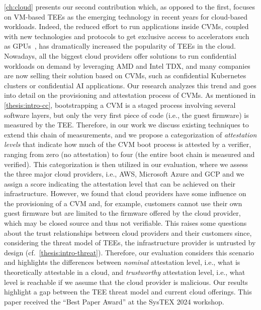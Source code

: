 \cref{ch:cloud} presents our second contribution which, as opposed to the first,
focuses on \acs{VM}-based \acp{TEE} as the emerging technology in recent years
for cloud-based workloads. Indeed, the reduced effort to run applications inside
\acp{CVM}, coupled with new technologies and protocols to get exclusive access
to accelerators such as GPUs~\cite{nvidiaCC}, has dramatically increased the
popularity of \acp{TEE} in the cloud. Nowadays, all the biggest cloud providers
offer solutions to run confidential workloads on demand by leveraging AMD
\sevsnp{} and Intel \ac{TDX}, and many companies are now selling their solution
based on \acp{CVM}, such as confidential Kubernetes clusters or confidential AI
applications. Our research analyzes this trend and goes into detail on the
provisioning and attestation process of \acp{CVM}. As mentioned in
\cref{thesis:intro-cc}, bootstrapping a \ac{CVM} is a staged process involving
several software layers, but only the very first piece of code (i.e., the guest
firmware) is measured by the \ac{TEE}. Therefore, in our work we discuss
existing techniques to extend this chain of measurements, and we propose a
categorization of \emph{attestation levels} that indicate how much of the
\ac{CVM} boot process is attested by a verifier, ranging from zero (no
attestation) to four (the entire boot chain is measured and verified). This
categorization is then utilized in our evaluation, where we assess the three
major cloud providers, i.e., \ac{AWS}, Microsoft Azure and \ac{GCP} and we
assign a score indicating the attestation level that can be achieved on their
infrastructure. However, we found that cloud providers have some influence on
the provisioning of a \ac{CVM} and, for example, customers cannot use their own
guest firmware but are limited to the firmware offered by the cloud provider,
which may be closed source and thus not verifiable. This raises some questions
about the trust relationships between cloud providers and their customers since,
considering the threat model of \acp{TEE}, the infrastructure provider is
untrusted by design (cf.~\cref{thesis:intro-threat}). Therefore, our evaluation
considers this scenario and highlights the differences between \emph{nominal}
attestation level, i.e., what is theoretically attestable in a cloud, and
\emph{trustworthy} attestation level, i.e., what level is reachable if we assume
that the cloud provider is malicious. Our results highlight a gap between the
\ac{TEE} threat model and current cloud offerings. This paper received the
``Best Paper Award'' at the SysTEX 2024 workshop.

